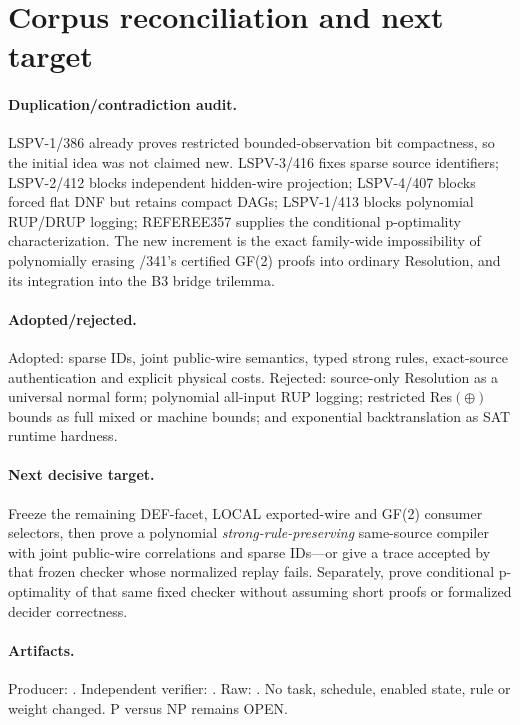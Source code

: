 \documentclass[11pt]{article}
\begin{document}
\section{Corpus reconciliation and next target}

\paragraph{Duplication/contradiction audit.}
LSPV-1/386 already proves restricted bounded-observation bit compactness, so the initial idea was not claimed new.  LSPV-3/416 fixes sparse source identifiers; LSPV-2/412 blocks independent hidden-wire projection; LSPV-4/407 blocks forced flat DNF but retains compact DAGs; LSPV-1/413 blocks polynomial RUP/DRUP logging; REFEREE357 supplies the conditional p-optimality characterization.  The new increment is the exact family-wide impossibility of polynomially erasing /341's certified GF(2) proofs into ordinary Resolution, and its integration into the B3 bridge trilemma.

\paragraph{Adopted/rejected.}
Adopted: sparse IDs, joint public-wire semantics, typed strong rules, exact-source authentication and explicit physical costs.  Rejected: source-only Resolution as a universal normal form; polynomial all-input RUP logging; restricted Res$(\oplus)$ bounds as full mixed or machine bounds; and exponential backtranslation as SAT runtime hardness.

\paragraph{Next decisive target.}
Freeze the remaining DEF-facet, LOCAL exported-wire and GF(2) consumer selectors, then prove a polynomial \emph{strong-rule-preserving} same-source compiler with joint public-wire correlations and sparse IDs—or give a trace accepted by that frozen checker whose normalized replay fails.  Separately, prove conditional p-optimality of that same fixed checker without assuming short proofs or formalized decider correctness.

\paragraph{Artifacts.}
Producer: .  Independent verifier: .  Raw: .  No task, schedule, enabled state, rule or weight changed.  P versus NP remains OPEN.
\end{document}
